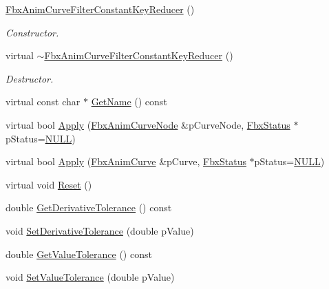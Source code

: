 \begin{DoxyCompactItemize}
\item 
\hyperlink{class_fbx_anim_curve_filter_constant_key_reducer_a5baf6160f4bf332b9235e0d1abb1aa3a}{Fbx\+Anim\+Curve\+Filter\+Constant\+Key\+Reducer} ()
\begin{DoxyCompactList}\small\item\em Constructor. \end{DoxyCompactList}\item 
virtual \hyperlink{class_fbx_anim_curve_filter_constant_key_reducer_a523519a310cf98a3823b221ab9973069}{$\sim$\+Fbx\+Anim\+Curve\+Filter\+Constant\+Key\+Reducer} ()
\begin{DoxyCompactList}\small\item\em Destructor. \end{DoxyCompactList}\item 
virtual const char $\ast$ \hyperlink{class_fbx_anim_curve_filter_constant_key_reducer_a1f856490df5d301d1c1e202958a3240c}{Get\+Name} () const
\item 
virtual bool \hyperlink{class_fbx_anim_curve_filter_constant_key_reducer_a54f43929707bc95bc5d0830ec039fde2}{Apply} (\hyperlink{class_fbx_anim_curve_node}{Fbx\+Anim\+Curve\+Node} \&p\+Curve\+Node, \hyperlink{class_fbx_status}{Fbx\+Status} $\ast$p\+Status=\hyperlink{fbxarch_8h_a070d2ce7b6bb7e5c05602aa8c308d0c4}{N\+U\+LL})
\item 
virtual bool \hyperlink{class_fbx_anim_curve_filter_constant_key_reducer_a45c9f6f26dc37686d684e1a35ac6b4c0}{Apply} (\hyperlink{class_fbx_anim_curve}{Fbx\+Anim\+Curve} \&p\+Curve, \hyperlink{class_fbx_status}{Fbx\+Status} $\ast$p\+Status=\hyperlink{fbxarch_8h_a070d2ce7b6bb7e5c05602aa8c308d0c4}{N\+U\+LL})
\item 
virtual void \hyperlink{class_fbx_anim_curve_filter_constant_key_reducer_a6961f8cd2d86b3f0b0c503c021bac93b}{Reset} ()
\item 
double \hyperlink{class_fbx_anim_curve_filter_constant_key_reducer_adae1590528c85fe9c4186652c97d8d19}{Get\+Derivative\+Tolerance} () const
\item 
void \hyperlink{class_fbx_anim_curve_filter_constant_key_reducer_ac0db44875a6a8d68e41a331948e8bf1f}{Set\+Derivative\+Tolerance} (double p\+Value)
\item 
double \hyperlink{class_fbx_anim_curve_filter_constant_key_reducer_a0ff1db2f653a0217e0560550be3d947f}{Get\+Value\+Tolerance} () const
\item 
void \hyperlink{class_fbx_anim_curve_filter_constant_key_reducer_a86a4427b2a29f5a82a0d1535048a44eb}{Set\+Value\+Tolerance} (double p\+Value)

\end{DoxyCompactItemize}
